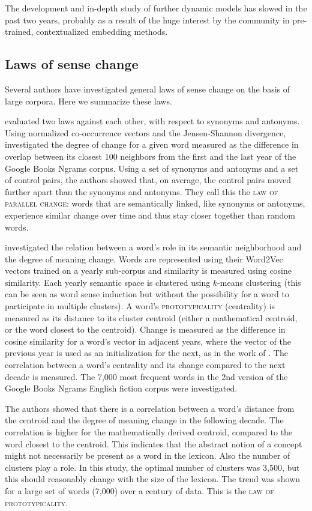 \documentclass[output=paper]{langsci/langscibook}
\begin{document}
The development and in-depth study of further dynamic models has slowed in the past two years, probably as a result of the huge interest by the community in pre-trained, contextualized embedding methods. 


\subsection{Laws of sense change}\label{subs:lawsofchange}
Several authors have investigated general laws of sense change on the basis of large corpora. Here we summarize these laws. 

\citet{xu15} evaluated two laws against each other, with respect to synonyms and antonyms. Using normalized co-occurrence vectors and the Jensen-Shannon divergence, \citet{xu15} investigated the degree of change for a given word measured as the difference in overlap between its closest 100 neighbors from the first and the last year of the Google Books Ngrams corpus. Using a set of synonyms and antonyms and a set of control pairs, the authors showed that, on average, the control pairs moved further apart than the synonyms and antonyms. They call this the \textsc{law of parallel change}: words that are semantically linked, like synonyms or antonyms, experience similar change over time and thus stay closer together than random words. 

\citet{dubossarsky2015bottom} investigated the relation between a word's role in its semantic neighborhood and the degree of meaning change. Words are represented using their Word2Vec vectors trained on a yearly sub-corpus and similarity is measured using cosine similarity. Each yearly semantic space is clustered using $k$-means clustering (this can be seen as word sense induction but without the possibility for a word to participate in multiple clusters). A word's  \textsc{prototypicality} (centrality) is measured as its distance to its cluster centroid (either a mathematical centroid, or the word closest to the centroid). Change is measured as the difference in cosine similarity for a word's vector in adjacent years, where the vector of the previous year is used as an initialization for the next, as in the work of \citet{kim-etal-2014-temporal}.  The correlation between a word's centrality and its change compared to the next decade is measured. The 7,000 most frequent words in the 2nd version of the Google Books Ngrams English fiction corpus were investigated.

The authors showed that there is a correlation between a word's distance from the centroid and the degree of meaning change in the following decade. The correlation is higher for the mathematically derived centroid, compared to the word closest to the centroid. This indicates that the abstract notion of a concept might not necessarily be present as a word in the lexicon. Also the number of clusters play a role. In this study, the optimal number of clusters was 3,500, but this should reasonably change with the size of the lexicon. The trend was shown for a large set of words (7,000) over a century of data. This is the \textsc{law of prototypicality}. 
\end{document}
